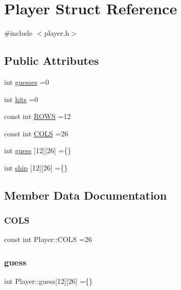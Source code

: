 \hypertarget{struct_player}{}\section{Player Struct Reference}
\label{struct_player}


{\ttfamily \#include $<$player.\+h$>$}

\subsection*{Public Attributes}
\begin{DoxyCompactItemize}
\item 
int \hyperlink{struct_player_aa786f3096665b656ab564841a75ffebd}{guesses} =0
\item 
int \hyperlink{struct_player_a052222bcdb49688a6a4afa2687498db4}{hits} =0
\item 
const int \hyperlink{struct_player_a05e8513ffc24371b5c242ef17b5cfba1}{R\+O\+WS} =12
\item 
const int \hyperlink{struct_player_add95189ad02241243a45d93dc3b793f2}{C\+O\+LS} =26
\item 
int \hyperlink{struct_player_ab0219b4a6d9affb21471836b70939a56}{guess} \mbox{[}12\mbox{]}\mbox{[}26\mbox{]} =\{\}
\item 
int \hyperlink{struct_player_acee20c03cd87a5596defc5bf0f1bd77e}{ship} \mbox{[}12\mbox{]}\mbox{[}26\mbox{]} =\{\}
\end{DoxyCompactItemize}


\subsection{Member Data Documentation}
\mbox{\label{struct_player_add95189ad02241243a45d93dc3b793f2}} 
\subsubsection{\texorpdfstring{C\+O\+LS}{COLS}}
{\footnotesize\ttfamily const int Player\+::\+C\+O\+LS =26}

\mbox{\label{struct_player_ab0219b4a6d9affb21471836b70939a56}} 
\subsubsection{\texorpdfstring{guess}{guess}}
{\footnotesize\ttfamily int Player\+::guess\mbox{[}12\mbox{]}\mbox{[}26\mbox{]} =\{\}}

